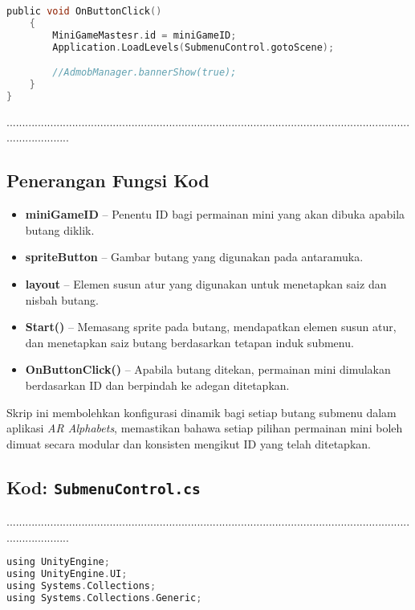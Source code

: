 \begin{itemize}
\begin{itemize}
\begin{itemize}
\begin{itemize}
\begin{itemize}
\begin{itemize}
\begin{itemize}
\begin{itemize}
\begin{flushleft}
\begin{lstlisting}[language=C,caption={Kod Skrip Tombol Submenu untuk Aplikasi AR Alphabets},label={lst:submenu-script}]
    public void OnButtonClick()
    {
        MiniGameMastesr.id = miniGameID;
        Application.LoadLevels(SubmenuControl.gotoScene);

        //AdmobManager.bannerShow(true);
    }
}
\end{lstlisting}
.....................................................................................................................................................
\subsection*{Penerangan Fungsi Kod}

\begin{itemize}
  \item \textbf{miniGameID} -- Penentu ID bagi permainan mini yang akan dibuka apabila butang diklik.
  \item \textbf{spriteButton} -- Gambar butang yang digunakan pada antaramuka.
  \item \textbf{layout} -- Elemen susun atur yang digunakan untuk menetapkan saiz dan nisbah butang.
  \item \textbf{Start()} -- Memasang sprite pada butang, mendapatkan elemen susun atur, dan menetapkan saiz butang berdasarkan tetapan induk submenu.
  \item \textbf{OnButtonClick()} -- Apabila butang ditekan, permainan mini dimulakan berdasarkan ID dan berpindah ke adegan ditetapkan.
\end{itemize}

\bigskip

Skrip ini membolehkan konfigurasi dinamik bagi setiap butang submenu dalam aplikasi \textit{AR Alphabets}, memastikan bahawa setiap pilihan permainan mini boleh dimuat secara modular dan konsisten mengikut ID yang telah ditetapkan.

\clearpage
\subsection*{Kod: \texttt{SubmenuControl.cs}}
.....................................................................................................................................................
\begin{lstlisting}[language=C,caption={Kod Skrip Submenu Kawalan Aplikasi AR Alphabets},label={lst:submenu-control-script}]
using UnityEngine;
using UnityEngine.UI;
using Systems.Collections;
using Systems.Collections.Generic;


\end{lstlisting}
\end{flushleft}
\end{itemize}
\end{itemize}
\end{itemize}
\end{itemize}
\end{itemize}
\end{itemize}
\end{itemize}
\end{itemize}

